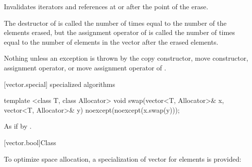 \begin{itemdescr}
\pnum
\effects
Invalidates iterators and references at or after the point of the erase.

\pnum
\complexity
The destructor of  is called the number of times equal to the
number of the elements erased, but the assignment operator
of  is called the number of times equal to the number of
elements in the vector after the erased elements.

\pnum
\throws
Nothing unless an exception is thrown by the
copy constructor, move constructor,
assignment operator, or move assignment operator of
.
\end{itemdescr}

[vector.special]{ specialized algorithms}

%
\begin{itemdecl}
template <class T, class Allocator>
  void swap(vector<T, Allocator>& x, vector<T, Allocator>& y)
    noexcept(noexcept(x.swap(y)));
\end{itemdecl}

\begin{itemdescr}
\pnum
\effects
As if by .
\end{itemdescr}

[vector.bool]{Class }

\pnum
{}%
To optimize space allocation, a specialization of vector for
elements is provided:

